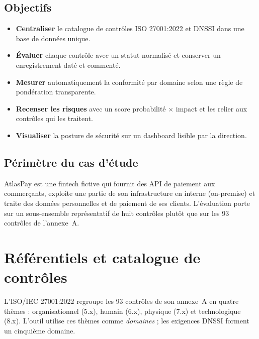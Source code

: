 \documentclass[11pt,a4paper]{article}
\begin{document}
\subsection{Objectifs}
\begin{itemize}
  \item \textbf{Centraliser} le catalogue de contrôles ISO 27001:2022 et DNSSI dans une base de données unique.
  \item \textbf{Évaluer} chaque contrôle avec un statut normalisé et conserver un enregistrement daté et commenté.
  \item \textbf{Mesurer} automatiquement la conformité par domaine selon une règle de pondération transparente.
  \item \textbf{Recenser les risques} avec un score probabilité $\times$ impact et les relier aux contrôles qui les traitent.
  \item \textbf{Visualiser} la posture de sécurité sur un dashboard lisible par la direction.
\end{itemize}

\subsection{Périmètre du cas d'étude}
AtlasPay est une fintech fictive qui fournit des API de paiement aux commerçants, exploite une partie de son infrastructure en interne (on-premise) et traite des données personnelles et de paiement de ses clients. L'évaluation porte sur un sous-ensemble représentatif de huit contrôles plutôt que sur les 93 contrôles de l'annexe~A.

\section{Référentiels et catalogue de contrôles}
L'ISO/IEC 27001:2022 regroupe les 93 contrôles de son annexe~A en quatre thèmes : organisationnel (5.x), humain (6.x), physique (7.x) et technologique (8.x). L'outil utilise ces thèmes comme \emph{domaines} ; les exigences DNSSI forment un cinquième domaine.
\end{document}
